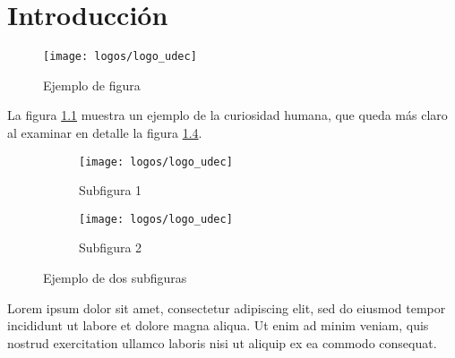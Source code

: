 \chapter{Introducción}

\begin{figure}[tb]
	\centering
	\texttt{[image: logos/logo\_udec]}
	\caption{Ejemplo de figura}
	\label{fig:example1}
\end{figure}

La figura \ref{fig:example1} muestra un ejemplo de la curiosidad humana, que queda más claro al examinar en detalle la figura \ref{fig:1:two_subfig}.

\begin{figure}[!tb]
	\centering
	\begin{subfigure}[b]{3cm}
		\centering
		\texttt{[image: logos/logo\_udec]}
		\caption{Subfigura 1}
		\label{fig:1:subfig1}
	\end{subfigure}
	\hspace*{2cm}
	\begin{subfigure}[b]{3cm}
		\centering
		\texttt{[image: logos/logo\_udec]}
		\caption{Subfigura 2}
		\label{fig:fig1:subfig2}
	\end{subfigure}
	\caption{Ejemplo de dos subfiguras}
	\label{fig:1:two_subfig}
\end{figure}


Lorem ipsum dolor sit amet, consectetur adipiscing elit, sed do eiusmod tempor incididunt ut labore et dolore magna aliqua. Ut enim ad minim veniam, quis nostrud exercitation ullamco laboris nisi ut aliquip ex ea commodo consequat.
